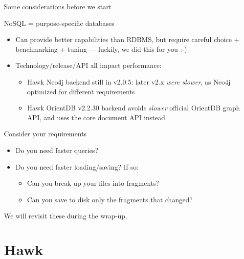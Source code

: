 \documentclass[10pt]{beamer}
\begin{document}
\begin{frame}{Some considerations before we start}

  \begin{block}{NoSQL = purpose-specific databases}
    \begin{itemize}
    \item Can provide better capabilities than RDBMS, but require careful choice
      + benchmarking + tuning --- luckily, we did this for you :-)
    \item Technology/release/API all impact performance:
      \begin{itemize}
      \item Hawk Neo4j backend still in v2.0.5: later v2.x \emph{were slower},
        as Neo4j optimized for different requirements
      \item Hawk OrientDB v2.2.30 backend avoids \emph{slower} official OrientDB
        graph API, and uses the core document API instead
      \end{itemize}
    \end{itemize}
  \end{block}

  \begin{block}{Consider your requirements}
    \begin{itemize}
    \item Do you need faster queries?
    \item Do you need faster loading/saving? If so:
      \begin{itemize}
      \item Can you break up your files into fragments?
      \item Can you save to disk only the fragments that changed?
      \end{itemize}
    \end{itemize}

    We will revisit these during the wrap-up.
  \end{block}

\end{frame}

\section{Hawk}
\end{document}

